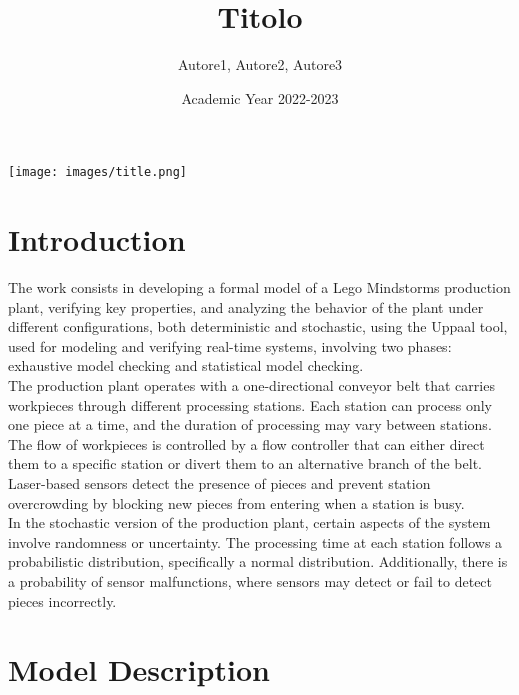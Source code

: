 \documentclass[11pt, oneside]{article}
\title{{\arial Titolo}}
\author{{\calibri Autore1, Autore2, Autore3}}
\date{Academic Year 2022-2023}
\begin{document}
\maketitle
\begin{center}
    \texttt{[image: images/title.png]}
\end{center}
\newpage
\vspace{.25in}

\section{Introduction}
The work consists in developing a formal model of a Lego Mindstorms production plant, verifying key properties, and analyzing the behavior of the plant under different configurations, both deterministic and stochastic, using the Uppaal tool, used for modeling and verifying real-time systems, involving two phases: exhaustive model checking and statistical model checking. \\
The production plant operates with a one-directional conveyor belt that carries workpieces through different processing stations. Each station can process only one piece at a time, and the duration of processing may vary between stations. The flow of workpieces is controlled by a flow controller that can either direct them to a specific station or divert them to an alternative branch of the belt. Laser-based sensors detect the presence of pieces and prevent station overcrowding by blocking new pieces from entering when a station is busy. \\
In the stochastic version of the production plant, certain aspects of the system involve randomness or uncertainty. The processing time at each station follows a probabilistic distribution, specifically a normal distribution. Additionally, there is a probability of sensor malfunctions, where sensors may detect or fail to detect pieces incorrectly. 
\section{Model Description}
\end{document}
